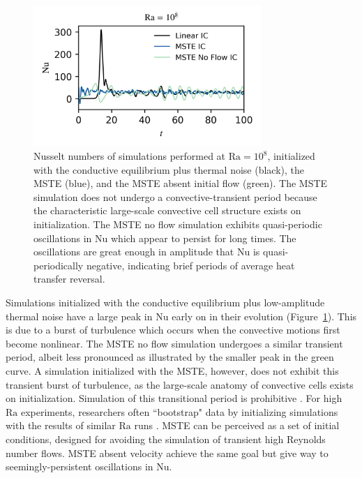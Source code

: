 \documentclass[reprint,amsmath,amssymb,aps,nofootinbib]{revtex4-1}
\newcommand\Ra{\mathrm{Ra}}
\newcommand\Nu{\mathrm{Nu}}
\begin{document}
\begin{figure}
    \centering
    \includegraphics[width=3.4in]{sim_eq_nu_noflow.png}
    \caption{Nusselt numbers of simulations performed at $\Ra = 10^8$, initialized with the conductive equilibrium plus thermal noise (black), the MSTE (blue), and the MSTE absent initial flow (green). 
    The MSTE simulation does not undergo a convective-transient period because the characteristic large-scale convective cell structure exists on initialization.
    The MSTE no flow simulation exhibits quasi-periodic oscillations in $\Nu$ which appear to persist for long times.
    The oscillations are great enough in amplitude that $\Nu$ is quasi-periodically negative, indicating brief periods of average heat transfer reversal.}
    \label{fig:nu_sim}
\end{figure}

Simulations initialized with the conductive equilibrium plus low-amplitude thermal noise have a large peak in $\Nu$ early on in their evolution (Figure~\ref{fig:nu_sim}).
This is due to a burst of turbulence which occurs when the convective motions first become nonlinear.
The MSTE no flow simulation undergoes a similar transient period, albeit less pronounced as illustrated by the smaller peak in the green curve.
A simulation initialized with the MSTE, however, does not exhibit this transient burst of turbulence, as the large-scale anatomy of convective cells exists on initialization. 
Simulation of this transitional period is prohibitive \cite{Anders_AE}. 
For high $\Ra$ experiments, researchers often ``bootstrap" data by initializing simulations with the results of similar $\Ra$ runs \cite{Verzicco, Johnston}. 
MSTE can be perceived as a set of initial conditions, designed for avoiding the simulation of transient high Reynolds number flows.
MSTE absent velocity achieve the same goal but give way to seemingly-persistent oscillations in $\Nu$. 
\end{document}
